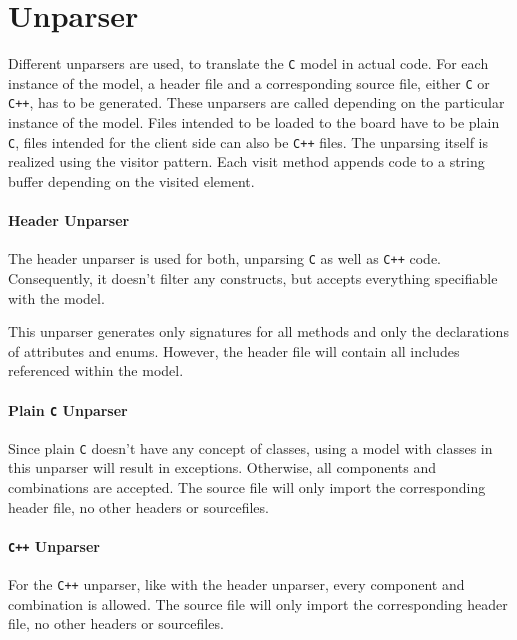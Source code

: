 \documentclass{report}
\begin{document}
\section{Unparser}
Different unparsers are used, to translate the \texttt{C} model in actual code. For each instance of the model, a header file and a corresponding source file, either \texttt{C} or \texttt{C++}, has to be generated. These unparsers are called depending on the particular instance of the model. Files intended to be loaded to the board have to be plain \texttt{C}, files intended for the client side can also be \texttt{C++} files. The unparsing itself is realized using the visitor pattern. Each visit method appends code to a string buffer depending on the visited element.

\paragraph{Header Unparser}
The header unparser is used for both, unparsing \texttt{C} as well as \texttt{C++} code. Consequently, it doesn't filter any constructs, but accepts everything specifiable with the model.

This unparser generates only signatures for all methods and only the declarations of attributes and enums. However, the header file will contain all includes referenced within the model.

\paragraph{Plain \texttt{C} Unparser}
Since plain \texttt{C} doesn't have any concept of classes, using a model with classes in this unparser will result in exceptions. Otherwise, all components and combinations are accepted. The source file will only import the corresponding header file, no other headers or sourcefiles.

\paragraph{\texttt{C++} Unparser}
For the \texttt{C++} unparser, like with the header unparser, every component and combination is allowed. The source file will only import the corresponding header file, no other headers or sourcefiles.




\newpage
\pagestyle{empty}


\end{document}
